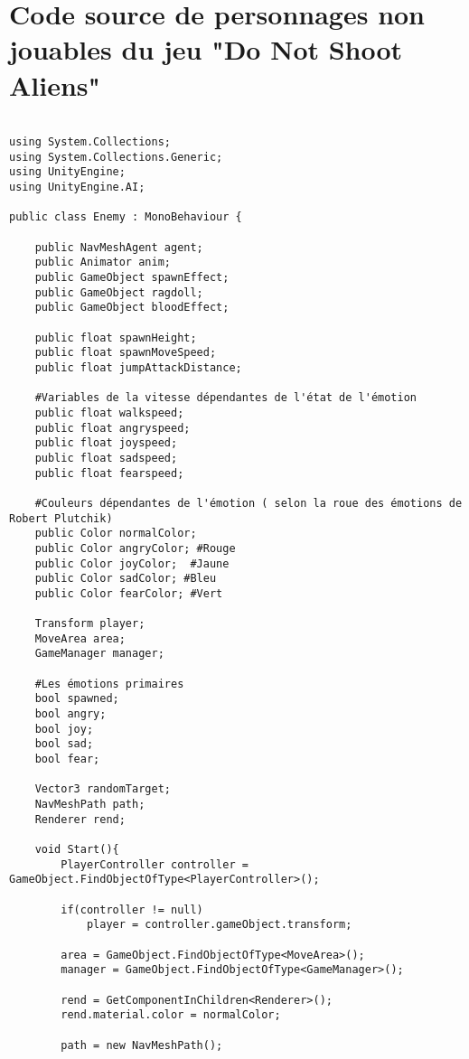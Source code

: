 
\chapter{Code source de personnages non jouables du jeu "Do Not Shoot Aliens"} %

\label{AppendixA} %


\begin{lstlisting}[language=Csh]

using System.Collections;
using System.Collections.Generic;
using UnityEngine;
using UnityEngine.AI;

public class Enemy : MonoBehaviour {
    
	public NavMeshAgent agent;
	public Animator anim;
	public GameObject spawnEffect;
	public GameObject ragdoll;
	public GameObject bloodEffect;
	
	public float spawnHeight;
	public float spawnMoveSpeed;
	public float jumpAttackDistance;

    #Variables de la vitesse dépendantes de l'état de l'émotion
    public float walkspeed;
    public float angryspeed;
    public float joyspeed;
    public float sadspeed;
    public float fearspeed;

    #Couleurs dépendantes de l'émotion ( selon la roue des émotions de Robert Plutchik)
    public Color normalColor;
    public Color angryColor; #Rouge
    public Color joyColor;  #Jaune
    public Color sadColor; #Bleu
    public Color fearColor; #Vert

    Transform player;
	MoveArea area;
	GameManager manager;

    #Les émotions primaires 
    bool spawned;
    bool angry;
    bool joy;
    bool sad;
    bool fear;

    Vector3 randomTarget;
	NavMeshPath path;
	Renderer rend;
	
	void Start(){
		PlayerController controller = GameObject.FindObjectOfType<PlayerController>();
		
		if(controller != null)
			player = controller.gameObject.transform;
		
		area = GameObject.FindObjectOfType<MoveArea>();
		manager = GameObject.FindObjectOfType<GameManager>();
		
		rend = GetComponentInChildren<Renderer>();
		rend.material.color = normalColor;
		
		path = new NavMeshPath();
	

\end{lstlisting}
